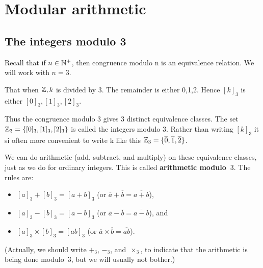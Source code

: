 \documentclass[../MATH-2000-Notes.tex]{subfiles}
\begin{document}
\section{Modular arithmetic}
\subsection{The integers modulo 3} Recall that if \(n\in \mathbb{N}^+\), then congruence modulo n is an equivalence relation. We will work with \(n=3\).
\begin{Note}
    That when \(\mathbb{Z}, k \) is divided by 3. The remainder is either 0,1,2. Hence \([k]_3\) is either \([0]_3, [1]_3, [2]_3\).
\end{Note}

Thus the congruence modulo 3 gives 3 distinct equivalence classes. The set \(\mathbb{Z}_3 = \{[0]_3, [1]_3, [2]_3\}\) is called the integers modulo 3. Rather than writing \([k]_3\) it si often more convenient to write k like this \(\mathbb{Z}_3 = \{\overline{0},\overline{1},\overline{2}\}\).

We can do arithmetic (add, subtract, and multiply) on these equivalence classes, just as we do for ordinary integers. This is called  \textbf{arithmetic modulo~$3$}. The rules are:
\begin{itemize}
    \item $[a]_3 + [b]_3 = [a+b]_3$ \qquad (or $\overline{a} + \overline{b} = \overline{a + b}$),
    \item $[a]_3 - [b]_3 = [a-b]_3$ \qquad (or $\overline{a} - \overline{b} = \overline{a - b}$),
          and
    \item $[a]_3 \times [b]_3 = [ab]_3$\hphantom{${}\times{}$}
          \qquad (or $\overline{a} \times \overline{b} = \overline{a  b}$).
\end{itemize}
(Actually, we should write $+_3$, $-_3$, and~$\times_3$, to indicate that the arithmetic is being done modulo~$3$, but we will usually not bother.)
\end{document}
